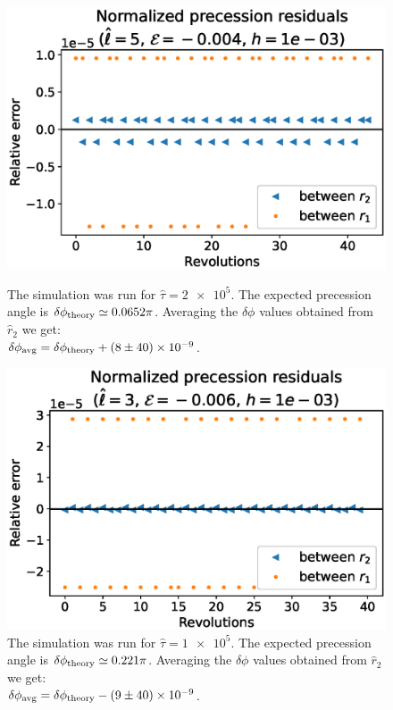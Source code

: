 \begin{figure}[h]
    \begin{minipage}{0.48 \textwidth}
        \centering
        \includegraphics[width=\textwidth]{Figures/chapter2/prec1_res_corr.eps}
        \caption{The simulation was run for $\hat \tau = \num{2e5}$.
        The expected precession angle is $\delta \phi_{\rm theory} \simeq 0.0652
        \pi$.
        Averaging the $\delta \phi$ values obtained from $\hat r_2$ we get: \\
        $\delta \phi_{\rm avg} = \delta \phi_{\rm theory} + (8 \pm 40) \times \num{e-9}$.}
        \label{cap2:fig:prec1_res_corr}
    \end{minipage}
    \hspace{0.015 \textwidth}
    \begin{minipage}{0.48 \textwidth}
        \centering
        \includegraphics[width=\textwidth]{Figures/chapter2/prec2_res_corr.eps}
        \caption{The simulation was run for $\hat \tau = \num{1e5}$.
        The expected precession angle is $\delta \phi_{\rm theory} \simeq 0.221
        \pi$.
        Averaging the $\delta \phi$ values obtained from $\hat r_2$ we get: \\
        $\delta \phi_{\rm avg} = \delta \phi_{\rm theory} - (9 \pm 40) \times \num{e-9}$.}
        \label{cap2:fig:prec2_res_corr}
    \end{minipage}
\end{figure}

